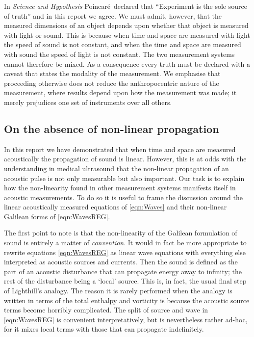 \documentclass[10pt, fleqn,final,showtrims,oldfontcommands, article,a4paper,oneside]{memoir} %
\newcommand{\secref}[1]{section~\ref{sec:#1}}
\newcommand{\eqnref}[1]{\ref{eqn:#1}}
\newcommand{\Poincare}{Poincar{\'e}}
\begin{document}
In {\em Science and Hypothesis}\cite{Poincare1902} \Poincare\ declared that ``Experiment is the sole source of truth''
and in this report we agree.
We must admit, however, that  the measured dimensions of an object 
depends upon whether
that object is measured with light or sound.
This is because when time and space are measured with light the speed of sound is not constant,
and when the time and space are measured with sound the speed of light is not constant.
The two measurement systems cannot therefore be mixed.
As a consequence  every truth  must be declared  with a caveat that states the modality of the measurement.
We emphasise that  proceeding otherwise does not reduce the anthropocentric nature of the measurement, 
where results depend upon how the measurement was made;
it merely prejudices one set of instruments over all others.


\subsection{On the absence of non-linear propagation} \label{sec:NonlinearProp}

In this report we have demonstrated that when time and space are measured acoustically
the propagation of sound is linear.
However, this is at odds with the  understanding in medical ultrasound that the non-linear propagation of an acoustic pulse
is not only measurable but also important.
Our task is to explain how the non-linearity found in other measurement systems  manifests itself in acoustic measurements.
To do so it is useful to frame the discussion around the linear acoustically measured equations of
\eqnref{Waves}
and their non-linear Galilean forms of \eqnref{WavesREG}.

The first point to note is that the non-linearity of the Galilean formulation of sound is entirely a matter of {\em  convention}.
It would in fact be more appropriate to rewrite equations \eqnref{WavesREG} as linear wave equations with everything else interpreted as acoustic sources and currents.
Then the sound is defined as the part of an acoustic disturbance that can propagate energy away to infinity;
the rest of the disturbance being a `local' source.
This is, in fact, the usual final step of Lighthill's analogy.
The reason it is rarely performed when the analogy is written in terms of the total enthalpy and vorticity is because
the acoustic source terms become horribly complicated.
The split of source and wave in \eqnref{WavesREG} is convenient  interpretatively, but is nevertheless rather ad-hoc,
for it mixes local terms with those that can propagate indefinitely.
\end{document}
